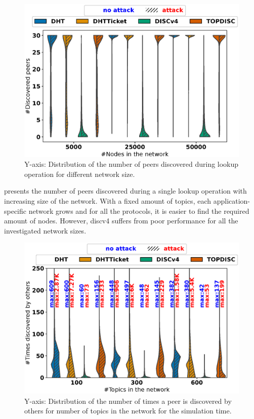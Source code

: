 \begin{figure}[!h]
\includegraphics[width=\linewidth]{results/split/size_discovered.eps}
\caption{Y-axis: Distribution of the number of peers discovered during lookup operation for different network size.}
\label{fig:discoveredPerSize}
\end{figure}

 presents the number of peers discovered during a single lookup operation with increasing size of the network. With a fixed amount of topics, each application-specific network grows and for all the protocols, it is easier to find the required amount of nodes. However, discv4 suffers from poor performance for all the investigated network sizes. 

\begin{figure}
\includegraphics[width=\linewidth]{results/split/topic_wasDiscovered.eps}
\caption{Y-axis: Distribution of the number of times a peer is discovered by others for number of topics in the network for the simulation time.}
\label{fig:discoveredByPerTopic}
\end{figure}

